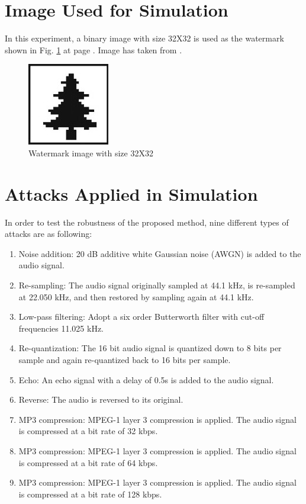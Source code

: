 \documentclass[12pt,a4paper]{report}
\begin{document}
\section{Image Used for Simulation}

In this experiment, a binary image with size 32X32 is used as the watermark shown in Fig. \ref{fig:H} at page \pageref{fig:H}. Image has taken from \cite{bhat2011audio}.


\begin{figure}[h!]
\centering
\includegraphics[scale=.8]{image/BN.jpg}
\caption{Watermark image with size 32X32}
\label{fig:H}
\end{figure}


\section{Attacks Applied in Simulation}

In order to test the robustness of the proposed method,
nine different types of attacks are as following:

\begin{enumerate}

\item Noise addition: 20 dB additive white Gaussian noise (AWGN) is added to the audio signal.

\item Re-sampling: The audio signal originally
sampled at 44.1 kHz, is re-sampled at 22.050 kHz, and then restored by sampling again at 44.1 kHz.

\item Low-pass filtering: Adopt a six order Butterworth
filter with cut-off frequencies 11.025 kHz.

\item Re-quantization: The 16 bit audio signal is quantized down to 8 bits per sample and again re-quantized back to 16 bits per sample.

\item Echo: An echo signal with a delay of 0.5s is added to the audio signal.

\item Reverse: The audio is reversed to its original.

\item MP3 compression: MPEG-1 layer 3 compression is applied. The audio signal is compressed at a bit rate of 32 kbps.

\item MP3 compression: MPEG-1 layer 3 compression is applied. The audio signal is compressed at a bit rate of 64 kbps.

\item MP3 compression: MPEG-1 layer 3 compression is applied. The audio signal is compressed at a bit rate of 128 kbps.

\end{enumerate}
\end{document}
